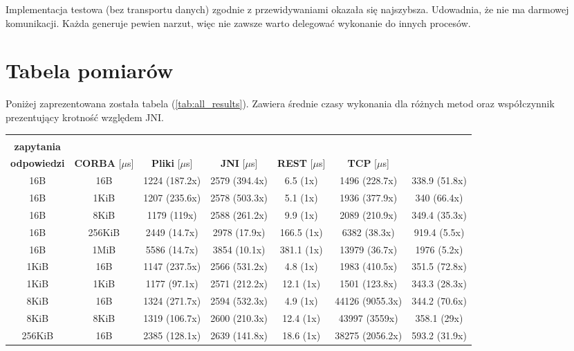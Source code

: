 Implementacja testowa (bez transportu danych) zgodnie z przewidywaniami okazała się najszybsza. Udowadnia, że nie ma darmowej komunikacji. Każda generuje pewien narzut, więc nie zawsze warto delegować wykonanie do innych procesów.


\section{Tabela pomiarów}

Poniżej zaprezentowana została tabela (\ref{tab:all_results}). Zawiera średnie czasy wykonania dla różnych metod oraz współczynnik prezentujący krotność względem JNI.

\begin{longtable}{|c|c|c|c|c|c|c|}
    \hline
    \begin{tabular}{@{}c@{}} \textbf{Rozmiar} \\ \textbf{zapytania} \end{tabular} & \begin{tabular}{@{}c@{}} \textbf{Rozmiar} \\ \textbf{odpowiedzi} \end{tabular} & \textbf{CORBA} [$\mu$s] & \textbf{Pliki} [$\mu$s] & \textbf{JNI} [$\mu$s] & \textbf{REST} [$\mu$s] & \textbf{TCP} [$\mu$s] \\
    \hline
    16B & 16B & 1224 (187.2x) & 2579 (394.4x) & 6.5 (1x) & 1496 (228.7x) & 338.9 (51.8x) \\
    16B & 1KiB & 1207 (235.6x) & 2578 (503.3x) & 5.1 (1x) & 1936 (377.9x) & 340 (66.4x) \\
    16B & 8KiB & 1179 (119x) & 2588 (261.2x) & 9.9 (1x) & 2089 (210.9x) & 349.4 (35.3x) \\
    16B & 256KiB & 2449 (14.7x) & 2978 (17.9x) & 166.5 (1x) & 6382 (38.3x) & 919.4 (5.5x) \\
    16B & 1MiB & 5586 (14.7x) & 3854 (10.1x) & 381.1 (1x) & 13979 (36.7x) & 1976 (5.2x) \\
    1KiB & 16B & 1147 (237.5x) & 2566 (531.2x) & 4.8 (1x) & 1983 (410.5x) & 351.5 (72.8x) \\
    1KiB & 1KiB & 1177 (97.1x) & 2571 (212.2x) & 12.1 (1x) & 1501 (123.8x) & 343.3 (28.3x) \\
    8KiB & 16B & 1324 (271.7x) & 2594 (532.3x) & 4.9 (1x) & 44126 (9055.3x) & 344.2 (70.6x) \\
    8KiB & 8KiB & 1319 (106.7x) & 2600 (210.3x) & 12.4 (1x) & 43997 (3559x) & 358.1 (29x) \\
    256KiB & 16B & 2385 (128.1x) & 2639 (141.8x) & 18.6 (1x) & 38275 (2056.2x) & 593.2 (31.9x) \\

\end{longtable}
